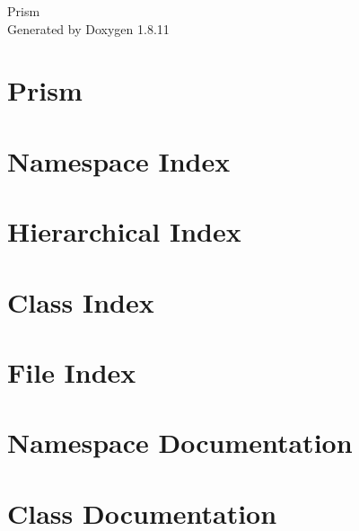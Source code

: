 \documentclass[twoside]{book}
\newcommand{\+}{\discretionary{\mbox{\scriptsize$\hookleftarrow$}}{}{}}
\newcommand{\clearemptydoublepage}{%
  \newpage{\pagestyle{empty}\cleardoublepage}%
}
\begin{document}
\hypersetup{pageanchor=false,
             bookmarksnumbered=true,
             pdfencoding=unicode
            }
\begin{titlepage}
\vspace*{7cm}
\begin{center}%
{\Large Prism }\\
\vspace*{1cm}
{\large Generated by Doxygen 1.8.11}\\
\end{center}
\end{titlepage}
\clearemptydoublepage
\tableofcontents
\clearemptydoublepage
{}
\hypersetup{pageanchor=true}

\chapter{Prism}
\label{md_README}
\hypertarget{md_README}{}

\chapter{Namespace Index}

\chapter{Hierarchical Index}

\chapter{Class Index}

\chapter{File Index}

\chapter{Namespace Documentation}

\chapter{Class Documentation}




























\end{document}
